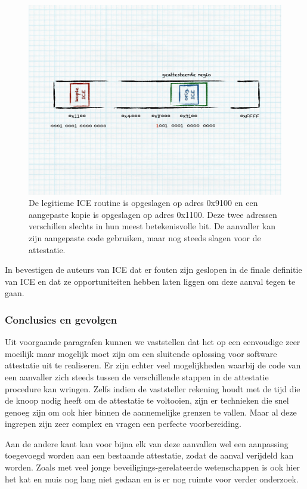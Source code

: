 \begin{figure}
  \centering
  \includegraphics[width=0.9\linewidth]{resources/attestation-ice-copy.pdf}
  \caption{De legitieme ICE routine is opgeslagen op adres 0x9100 en een
  aangepaste kopie is opgeslagen op adres 0x1100. Deze twee adressen
  verschillen slechts in hun meest betekenisvolle bit. De aanvaller kan zijn
  aangepaste code gebruiken, maar nog steeds slagen voor de attestatie.}
  \label{fig:attestation-ice-copy}
\end{figure}

In \cite{perrig2010refutation} bevestigen de auteurs van ICE dat er fouten zijn
geslopen in de finale definitie van ICE en dat ze opportuniteiten hebben laten
liggen om deze aanval tegen te gaan.

\subsubsection*{Conclusies en gevolgen}

Uit voorgaande paragrafen kunnen we vaststellen dat het op een eenvoudige \mcu
zeer moeilijk maar mogelijk moet zijn om een sluitende oplossing voor software
attestatie uit te realiseren. Er zijn echter veel mogelijkheden waarbij de code
van een aanvaller zich steeds tussen de verschillende stappen in de attestatie
procedure kan wringen. Zelfs indien de vaststeller rekening houdt met de tijd
die de knoop nodig heeft om de attestatie te voltooien, zijn er technieken die
snel genoeg zijn om ook hier binnen de aannemelijke grenzen te vallen. Maar al
deze ingrepen zijn zeer complex en vragen een perfecte voorbereiding.

Aan de andere kant kan voor bijna elk van deze aanvallen wel een aanpassing
toegevoegd worden aan een bestaande attestatie, zodat de aanval verijdeld kan
worden. Zoals met veel jonge beveiligings-gerelateerde wetenschappen is ook
hier het kat en muis nog lang niet gedaan en is er nog ruimte voor verder
onderzoek.

